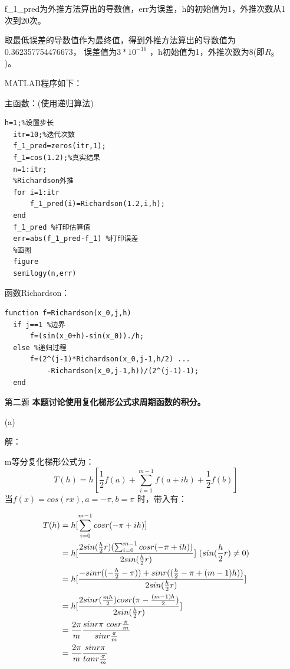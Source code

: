 \documentclass[12pt,a4paper,utf8]{ctexart}
\begin{document}
\begin{enumerate}
f\_1\_pred为外推方法算出的导数值，err为误差，h的初始值为1，外推次数从1次到20次。

取最低误差的导数值作为最终值，得到外推方法算出的导数值为0.362357754476673，
误差值为$ 3*10^{-16} $ ，h初始值为1，外推次数为8(即$ R_8 $ )。

MATLAB程序如下：

主函数：(使用递归算法)
\begin{lstlisting}[frame=single]
  h=1;%设置步长
  itr=10;%迭代次数
  f_1_pred=zeros(itr,1);
  f_1=cos(1.2);%真实结果
  n=1:itr;
  %Richardson外推
  for i=1:itr
      f_1_pred(i)=Richardson(1.2,i,h);
  end
  f_1_pred %打印估算值
  err=abs(f_1_pred-f_1) %打印误差
  %画图
  figure
  semilogy(n,err)
\end{lstlisting}
函数Richardson：
\begin{lstlisting}[frame=single]
  function f=Richardson(x_0,j,h)
  if j==1 %边界
      f=(sin(x_0+h)-sin(x_0))./h;
  else %递归过程
      f=(2^(j-1)*Richardson(x_0,j-1,h/2) ...
          -Richardson(x_0,j-1,h))/(2^(j-1)-1);
  end
\end{lstlisting}





\item[第二题]\textbf{本题讨论使用复化梯形公式求周期函数的积分。}  

(a)

解：

m等分复化梯形公式为：
$$
T(h)=h[\frac{1}{2} f(a)+\sum_{i=1}^{m-1}f(a+ih)+\frac{1}{2} f(b)]
$$
当$ f(x)=cos(rx),a=-\pi ,b=\pi $ 时，带入有：


\begin{equation}
    \begin{split}
       T(h) & = h[\sum_{i=0}^{m-1}cosr(-\pi +ih)] \\
            & = h[\frac{2sin(\frac{h}{2} r)(\sum_{i=0}^{m-1}cosr(-\pi +ih))}{2sin(\frac{h}{2} r)} ] \ (sin(\frac{h}{2} r)\neq 0) \\
            & = h[\frac{-sinr((-\frac{h}{2} -\pi) ) + sinr((\frac{h}{2} -\pi +(m-1)h) )}{2sin(\frac{h}{2} r)} ]\\
            & = h[\frac{2sinr(\frac{mh}{2} )cosr(\pi -\frac{(m-1)h}{2} )}{2sin(\frac{h}{2} r)} ]\\
            & = \frac{2\pi }{m}\frac{sinr\pi \ cosr\frac{\pi}{m} }{sinr\frac{\pi}{m}} \\
            & = \frac{2\pi }{m} \frac{sinr\pi }{tanr\frac{\pi}{m} } 
          \notag
       \end{split}
\end{equation}


\end{enumerate}
\end{document}

